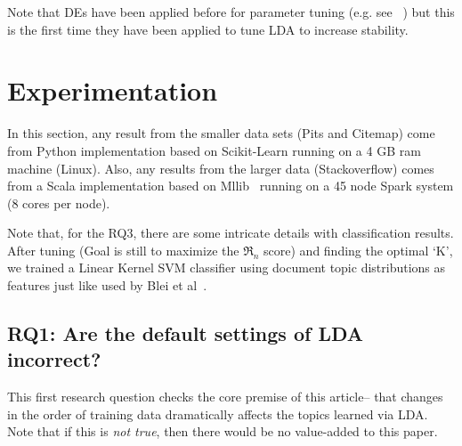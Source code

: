 \documentclass[twocolumn,5p,sort&compress]{elsarticle}
\theoremstyle{break}
\begin{document}
Note that DEs have been
applied before for parameter tuning (e.g. see~\cite{omran2005differential,chiha2012tuning, fu2016tuning} ) but this is the first time they have been
applied to tune LDA to increase stability.

\section{Experimentation}\label{sect:results}

In this section,
 any result from the smaller data sets (Pits and Citemap) come
from Python implementation based on Scikit-Learn running on a 4 GB ram machine (Linux).
Also,
  any results from the larger data (Stackoverflow) comes from a Scala implementation
  based on Mllib~\cite{meng2016mllib} running on a 45 node Spark system (8 cores per node).
  
  Note that, for the RQ3, there are some intricate details with classification results. After tuning (Goal is still to maximize the $\Re_n$ score) and finding the optimal `K', we trained a Linear Kernel SVM classifier using document topic distributions as features just like used by Blei et al~\cite{blei2003latent}.


\subsection{\textbf{RQ1: Are the default settings of LDA incorrect?}}\label{sect:unstable}


This first research question checks the core premise of this article-- that changes
in the order of training data dramatically affects the topics learned via LDA.
Note that if this is {\em not true}, then there would be no value-added to this paper. 
\end{document}
